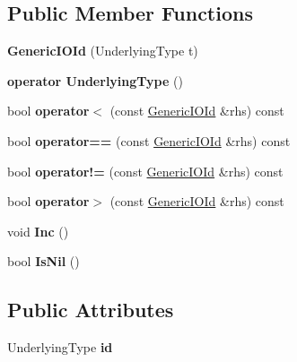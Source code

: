 \subsection*{Public Member Functions}
\begin{DoxyCompactItemize}
\item 
\mbox{\label{struct_generic_i_o_id_a75e650dd39839f73699079b42a088c50}} 
{\bfseries Generic\+I\+O\+Id} (Underlying\+Type t)
\item 
\mbox{\label{struct_generic_i_o_id_a4b134a163109d0cd995c7294f5b9a37d}} 
{\bfseries operator Underlying\+Type} ()
\item 
\mbox{\label{struct_generic_i_o_id_ae8a731b745c68906b0877f9921b33495}} 
bool {\bfseries operator$<$} (const \mbox{\hyperlink{struct_generic_i_o_id}{Generic\+I\+O\+Id}} \&rhs) const
\item 
\mbox{\label{struct_generic_i_o_id_ae2cd35af45e2c3ba452d14b283dfeaf8}} 
bool {\bfseries operator==} (const \mbox{\hyperlink{struct_generic_i_o_id}{Generic\+I\+O\+Id}} \&rhs) const
\item 
\mbox{\label{struct_generic_i_o_id_a173843de8afdfef5f9c1e24dd988022f}} 
bool {\bfseries operator!=} (const \mbox{\hyperlink{struct_generic_i_o_id}{Generic\+I\+O\+Id}} \&rhs) const
\item 
\mbox{\label{struct_generic_i_o_id_a05e71ca2208c0d928ea9cc3af0551631}} 
bool {\bfseries operator$>$} (const \mbox{\hyperlink{struct_generic_i_o_id}{Generic\+I\+O\+Id}} \&rhs) const
\item 
\mbox{\label{struct_generic_i_o_id_a6736463526708990d8b125beae554319}} 
void {\bfseries Inc} ()
\item 
\mbox{\label{struct_generic_i_o_id_a74de68dfd5c62f76fa89f67205388ab7}} 
bool {\bfseries Is\+Nil} ()
\end{DoxyCompactItemize}
\subsection*{Public Attributes}
\begin{DoxyCompactItemize}
\item 
\mbox{\label{struct_generic_i_o_id_aec0f873f62cbddabc4711d871ba15395}} 
Underlying\+Type {\bfseries id}
\end{DoxyCompactItemize}


